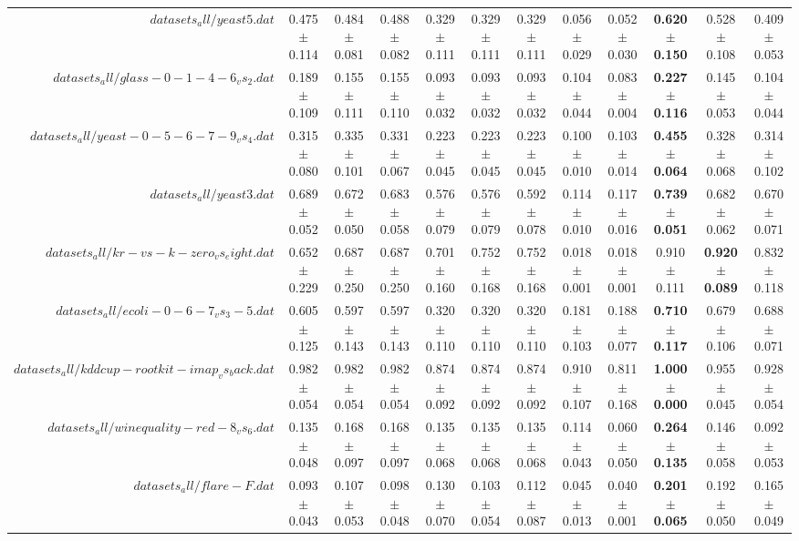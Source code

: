 \begin{table}[!ht]
{\begin{tabular}{r c c c c c c c c c c c}
$datasets_all/yeast5.dat$ & 0.475 $\pm$ 0.114 & 0.484 $\pm$ 0.081 & 0.488 $\pm$ 0.082 & 0.329 $\pm$ 0.111 & 0.329 $\pm$ 0.111 & 0.329 $\pm$ 0.111 & 0.056 $\pm$ 0.029 & 0.052 $\pm$ 0.030 & \textbf{0.620 $\pm$ 0.150} & 0.528 $\pm$ 0.108 & 0.409 $\pm$ 0.053 \\
$datasets_all/glass-0-1-4-6_vs_2.dat$ & 0.189 $\pm$ 0.109 & 0.155 $\pm$ 0.111 & 0.155 $\pm$ 0.110 & 0.093 $\pm$ 0.032 & 0.093 $\pm$ 0.032 & 0.093 $\pm$ 0.032 & 0.104 $\pm$ 0.044 & 0.083 $\pm$ 0.004 & \textbf{0.227 $\pm$ 0.116} & 0.145 $\pm$ 0.053 & 0.104 $\pm$ 0.044 \\
$datasets_all/yeast-0-5-6-7-9_vs_4.dat$ & 0.315 $\pm$ 0.080 & 0.335 $\pm$ 0.101 & 0.331 $\pm$ 0.067 & 0.223 $\pm$ 0.045 & 0.223 $\pm$ 0.045 & 0.223 $\pm$ 0.045 & 0.100 $\pm$ 0.010 & 0.103 $\pm$ 0.014 & \textbf{0.455 $\pm$ 0.064} & 0.328 $\pm$ 0.068 & 0.314 $\pm$ 0.102 \\
$datasets_all/yeast3.dat$ & 0.689 $\pm$ 0.052 & 0.672 $\pm$ 0.050 & 0.683 $\pm$ 0.058 & 0.576 $\pm$ 0.079 & 0.576 $\pm$ 0.079 & 0.592 $\pm$ 0.078 & 0.114 $\pm$ 0.010 & 0.117 $\pm$ 0.016 & \textbf{0.739 $\pm$ 0.051} & 0.682 $\pm$ 0.062 & 0.670 $\pm$ 0.071 \\
$datasets_all/kr-vs-k-zero_vs_eight.dat$ & 0.652 $\pm$ 0.229 & 0.687 $\pm$ 0.250 & 0.687 $\pm$ 0.250 & 0.701 $\pm$ 0.160 & 0.752 $\pm$ 0.168 & 0.752 $\pm$ 0.168 & 0.018 $\pm$ 0.001 & 0.018 $\pm$ 0.001 & 0.910 $\pm$ 0.111 & \textbf{0.920 $\pm$ 0.089} & 0.832 $\pm$ 0.118 \\
$datasets_all/ecoli-0-6-7_vs_3-5.dat$ & 0.605 $\pm$ 0.125 & 0.597 $\pm$ 0.143 & 0.597 $\pm$ 0.143 & 0.320 $\pm$ 0.110 & 0.320 $\pm$ 0.110 & 0.320 $\pm$ 0.110 & 0.181 $\pm$ 0.103 & 0.188 $\pm$ 0.077 & \textbf{0.710 $\pm$ 0.117} & 0.679 $\pm$ 0.106 & 0.688 $\pm$ 0.071 \\
$datasets_all/kddcup-rootkit-imap_vs_back.dat$ & 0.982 $\pm$ 0.054 & 0.982 $\pm$ 0.054 & 0.982 $\pm$ 0.054 & 0.874 $\pm$ 0.092 & 0.874 $\pm$ 0.092 & 0.874 $\pm$ 0.092 & 0.910 $\pm$ 0.107 & 0.811 $\pm$ 0.168 & \textbf{1.000 $\pm$ 0.000} & 0.955 $\pm$ 0.045 & 0.928 $\pm$ 0.054 \\
$datasets_all/winequality-red-8_vs_6.dat$ & 0.135 $\pm$ 0.048 & 0.168 $\pm$ 0.097 & 0.168 $\pm$ 0.097 & 0.135 $\pm$ 0.068 & 0.135 $\pm$ 0.068 & 0.135 $\pm$ 0.068 & 0.114 $\pm$ 0.043 & 0.060 $\pm$ 0.050 & \textbf{0.264 $\pm$ 0.135} & 0.146 $\pm$ 0.058 & 0.092 $\pm$ 0.053 \\
$datasets_all/flare-F.dat$ & 0.093 $\pm$ 0.043 & 0.107 $\pm$ 0.053 & 0.098 $\pm$ 0.048 & 0.130 $\pm$ 0.070 & 0.103 $\pm$ 0.054 & 0.112 $\pm$ 0.087 & 0.045 $\pm$ 0.013 & 0.040 $\pm$ 0.001 & \textbf{0.201 $\pm$ 0.065} & 0.192 $\pm$ 0.050 & 0.165 $\pm$ 0.049 \\

\end{tabular}}
\end{table}
